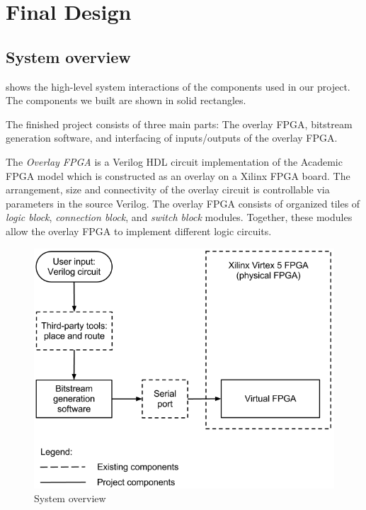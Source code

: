 \section{Final Design}


\subsection{System overview}
\label{system-overview}

 shows the high-level system interactions of the components used in our project.
The components we built are shown in solid rectangles.

The finished project consists of three main parts: The overlay FPGA, bitstream generation software, and interfacing of inputs/outputs of the overlay FPGA.

The \emph{Overlay FPGA} is a Verilog HDL circuit implementation of the Academic FPGA model which is constructed as an overlay on a Xilinx FPGA board.
The arrangement, size and connectivity of the overlay circuit is controllable via parameters in the source Verilog.
The overlay FPGA consists of organized tiles of \emph{logic block}, \emph{connection block}, and \emph{switch block} modules.
Together, these modules allow the overlay FPGA to implement different logic circuits.

\begin{figure}[!h]
	\centering
	\includegraphics[scale=0.6]{system.png}
	\caption{System overview}
	\label{system-diagram}
\end{figure}


